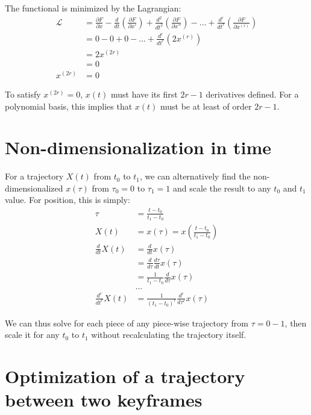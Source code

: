 \documentclass[11pt]{article}
\begin{document}
The functional is minimized by the Lagrangian:
\begin{align*}
\mathcal{L} &= \frac{ \partial F}{\partial x} - \frac{d}{dt} ( \frac{ \partial F}{\partial x' }  ) + \frac{d^2}{dt^2} ( \frac{ \partial F}{\partial x'' }  ) - ... + \frac{d^r}{dt^r} ( \frac{ \partial F}{\partial x^{(r)} }  ) \\
&= 0 - 0 + 0 - ... + \frac{d^r}{dt^r} (2 x^{(r)} ) \\
&= 2 x^{(2r)} \\
&= 0 \\
x^{(2r)} &= 0
\end{align*}

To satisfy $x^{(2r)} = 0$, $x(t)$ must have its first $2r-1$ derivatives defined. For a polynomial basis, this implies that $x(t)$ must be at least of order $2r-1$. 

\section{Non-dimensionalization in time}

For a trajectory $X(t)$ from $t_0$ to $t_1$, we can alternatively find the non-dimensionalized $x(\tau)$ from $\tau_0 = 0$ to $\tau_1 = 1$ and scale the result to any $t_0$ and $t_1$ value. For position, this is simply: 
\begin{align*}
\tau &= \frac{t-t_0}{t_1-t_0} \\
X(t) &= x(\tau) = x( \frac{t-t_0}{t_1-t_0}) \\
\frac{d}{dt} X(t) &= \frac{d}{dt} x(\tau) \\
& = \frac{d}{d \tau} \frac{d \tau}{dt} x(\tau) \\
&= \frac{1}{t_1-t_0} \frac{d}{d \tau} x(\tau) \\ 
& ... \\
\frac{d^r}{dt^r} X(t) &= \frac{1}{(t_1-t_0)^r} \frac{d^r}{d \tau^r} x(\tau)
\end{align*}

We can thus solve for each piece of any piece-wise trajectory from $\tau = 0-1$, then scale it for any $t_0$ to $t_1$ without recalculating the trajectory itself. 



\newpage
\section{Optimization of a trajectory between two keyframes} 
\end{document}
